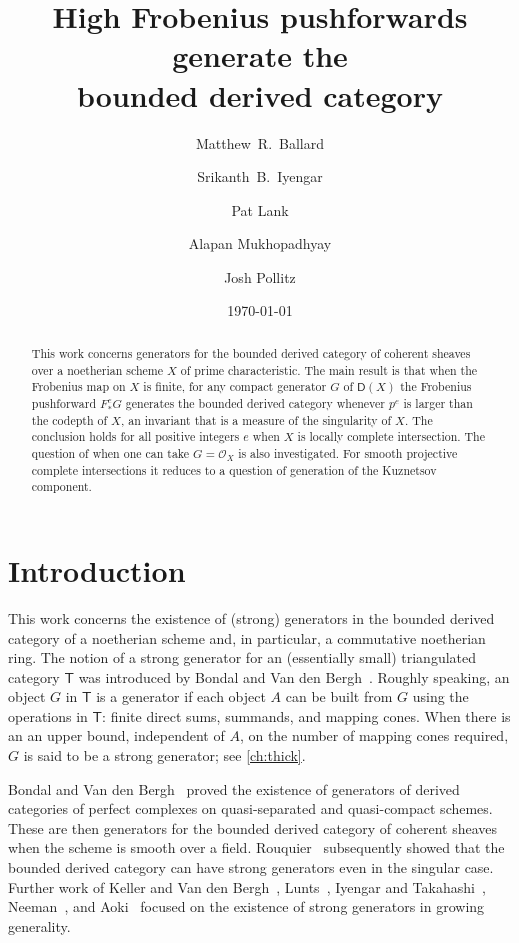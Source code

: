 \documentclass{amsart}
\title[Frobenius generators]{High Frobenius pushforwards generate the\\ bounded derived category}
\author[M.R.~Ballard]{Matthew~R.~Ballard}
\author[S.B.~Iyengar]{Srikanth~B.~Iyengar}
\author[P.~Lank]{Pat Lank}
\author[A.~Mukhopadhyay]{Alapan Mukhopadhyay}
\author[J.~Pollitz]{Josh Pollitz}
\date{\today}
\newcommand{\cat}[1]{{\mathsf{#1}}}
\newcounter{intro}
\theoremstyle{definition}
\theoremstyle{remark}
\numberwithin{equation}{subsection}
\begin{document}
\begin{abstract}
This work concerns generators for the bounded derived category of coherent sheaves over a noetherian scheme $X$ of prime characteristic. The main result is that when the Frobenius map on $X$ is finite, for any compact generator $G$ of $\mathsf{D}(X)$ the Frobenius pushforward $F ^e_*G$ generates the bounded derived category whenever $p^e$ is larger than the codepth of $X$, an invariant that is a measure of the singularity of $X$. The conclusion holds for all positive integers $e$ when $X$ is locally complete intersection. The question of when one can take $G=\mathcal{O}_X$ is also investigated. For smooth projective complete intersections it reduces to a question of generation of the Kuznetsov component.
\end{abstract}

\maketitle
\setcounter{tocdepth}{1}

\section*{Introduction}
\label{se:intro}

This work concerns the existence of (strong) generators in the bounded derived category of a noetherian scheme and, in particular, a commutative noetherian ring. The notion of a strong generator for an (essentially small) triangulated category $\cat T$ was introduced by Bondal and Van den Bergh~\cite{Bondal/VanDenBergh:2003}. Roughly speaking, an object $G$ in $\cat T$ is a generator if each object $A$ can be built from $G$ using the operations in $\cat T$: finite direct sums, summands, and mapping cones. When there is an an upper bound, independent of $A$, on the number of mapping cones required, $G$ is said to be a strong generator; see \cref{ch:thick}. 

Bondal and Van den Bergh~\cite{Bondal/VanDenBergh:2003} proved the existence of generators of derived categories of perfect complexes on quasi-separated and quasi-compact schemes. These are then generators for the bounded derived category of coherent sheaves when the scheme is smooth over a field. Rouquier~\cite{Rouquier:2008} subsequently showed that the bounded 
derived category can have strong generators even in the singular 
case. Further work of Keller and Van den Bergh~\cite{Keller/VanDenBergh:2009}, Lunts~\cite{Lunts:2010}, Iyengar and Takahashi~\cite{Iyengar/Takahashi:2016},  Neeman~\cite{Neeman:2021}, and Aoki~\cite{Aoki:2021} focused on the 
existence of strong generators in growing generality. 
\end{document}
